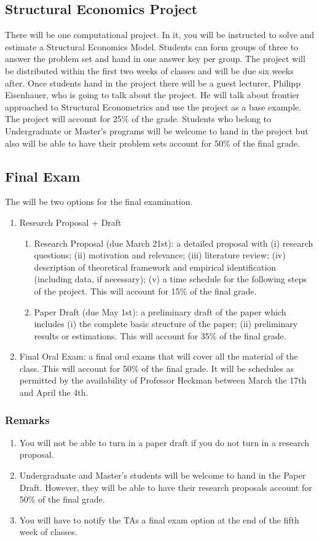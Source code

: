 \documentclass[12pt]{article}
\begin{document}
\subsection{Structural Economics Project}
\noindent There will be one computational project. In it, you will be instructed to solve and estimate a Structural Economics Model. Students can form groups of three to answer the problem set and hand in one answer key per group. The project will be distributed within the first two weeks of classes and will be due six weeks after. Once students hand in the project there will be a guest lecturer, Philipp Eisenhauer, who is going to talk about the project. He will talk about frontier approached to Structural Econometrics and use the project as a base example. The project will account for 25\% of the grade. Students who belong to Undergraduate or Master's programs will be welcome to hand in the project but also will be able to have their problem sets account for 50\% of the final grade.
\subsection{Final Exam}
The will be two options for the final examination.
\begin{enumerate}
\item Research Proposal + Draft
\begin{enumerate}
\item Research Proposal (due March 21st): a detailed proposal with (i) research questions; (ii) motivation and relevance; (iii) literature review; (iv) description of theoretical framework and empirical identification (including data, if necessary); (v) a time schedule for the following steps of the project. This will account for 15\% of the final grade.
\item Paper Draft (due May 1st): a preliminary draft of the paper which includes (i) the complete basic structure of the paper; (ii) preliminary results or estimations. This will account for 35\% of the final grade.
\end{enumerate}
\item Final Oral Exam: a final oral exams that will cover all the material of the class. This will account for 50\% of the final grade. It will be schedules as permitted by the availability of Professor Heckman between March the 17th and April the 4th.
\end{enumerate}
\subsubsection{Remarks}
\begin{enumerate}
\item You will not be able to turn in a paper draft if you do not turn in a research proposal.
\item Undergraduate and Master’s students will be welcome to hand in the Paper Draft. However, they will be able to have their research proposals account for 50\% of the final grade.
\item You will have to notify the TAs a final exam option at the end of the fifth week of classes.
\end{enumerate}
\end{document}
